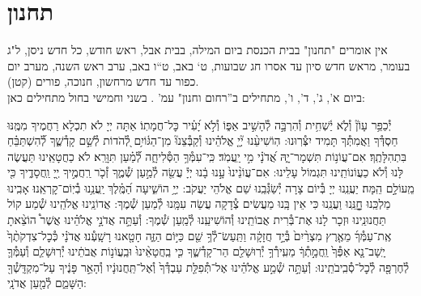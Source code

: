 \documentclass[twoside, openany, parskip=half, 11pt]{book}
\begin{document}
\nextpage


\section[תחנון]{ תחנון }
\label{tachanun mon thurs}
\begin{scriptsize}

\textsf{
אין אומרים "תחנון" בבית הכנסת ביום המילה, בבית אבל, ראש חודש, כל חדש ניסן, ל"ג בעומר, מראש חדש סיון עד אסרו חג שבועות, ט` באב, ט``ו באב, ערב ראש השנה, מערב יום כפור עד חדש מרחשון, חנוכה, פורים (קטן).\\
ביום א', ג', ד', ו', מתחילים ב''רחום וחנון" עמ'
\pageref{nefilas_apayim}.
בשני וחמישי בחול מתחילים כאן:
}

\end{scriptsize}

יְ֯כַפֵּ֥ר עָוֹן֘ וְ֯לֹ֢א יַ֫שְׁחִ֥ית וְ֯הִרְבָּ֣ה לְ֯הָשִׁ֣יב אַפּ֑וֹ וְ֯לֹ֣א יָ֝עִ֗יר כׇּל־חֲמָתֽוֹ׃ אַתָּה יְיָ לֹא תִכְלָא רַחֲמֶיךָ מִמֶּֽנּוּ חַסְדְּ֯ךָ וַאֲמִתְּ֯ךָ תָּמִיד יִצְּ֯רֽוּנוּ: הֽוֹשִׁיעֵ֨נוּ יְ֘יָ֤ אֱלֹהֵ֗ינוּ וְ֯קַבְּ֯צֵנוּ֘ מִן־הַגּ֫וֹיִ֥ם לְ֭֯הֹדוֹת לְ֯שֵׁ֣ם קָדְ֯שֶׁ֑ךָ לְ֝֯הִשְׁתַּבֵּ֗חַ בִּתְהִלָּתֶֽךָ׃
אִם־עֲוֹנ֥וֹת תִּשְׁמָר־יָ֑הּ אֲ֝דֹנָ֗י מִ֣י יַֽעֲמֹֽד׃ כִּֽי־עִמְּ֯ךָ֥ הַסְּ֯לִיחָ֑ה לְ֝֯מַ֗עַן תִּוָּרֵֽא׃ לֹא כַחֲטָאֵֽינוּ תַּעֲשֶׂה לָּנוּ וְ֯לֹא כַעֲוֹנוֹתֵֽינוּ תִּגְמוֹל עָלֵינוּ:
אִם־עֲוֹנֵ֨ינוּ֙ עָ֣נוּ בָ֔נוּ יְיָ֕ עֲשֵׂ֖ה לְ֯מַ֣עַן שְׁ֯מֶ֑ךָ זְ֯כֹ֤ר רַֽחֲמֶ֣יךָ יְ֖יָ וַֽחֲסָדֶ֑יךָ כִּ֖י מֵֽעוֹלָ֣ם הֵֽמָּה׃ יַעֲנֵֽנוּ יְיָ בְּ֯יוֹם צָרָה יְ֯שַׂגְּ֯בֵֽנוּ שֵׁם אֱלֹהֵי יַעֲקֹב:
יְיָ֥ הוֹשִׁ֑יעָה הַ֝מֶּֽ֗לֶךְ יַֽעֲנֵ֥נוּ בְ֯יֽוֹם־קׇרְאֵֽנוּ׃
אָבִֽינוּ מַלְכֵּֽנוּ חׇׇׇׇׇׇׇׇנֵּֽנוּ וַעֲנֵֽנוּ כִּי אֵין בָּֽנוּ מַעֲשִׂים צְ֯דָקָה עֲשֵׂה עִמָּֽנוּ לְ֯מַעַן שְׁ֯מֶךָ:
אֲדוֹנֵֽינוּ אֱלֹהֵֽינוּ שְׁ֯מַע קוֹל תַּחֲנוּנֵֽינוּ וּזְכָר לָנוּ אֶת־בְּ֯רִית אֲבוֹתֵֽינוּ וְ֯הוֹשִׁיעֵֽנוּ לְ֯מַֽעַן שְׁ֯מֶךָ:
וְ֯עַתָּ֣ה אֲדֹנָ֣י אֱלֹהֵ֗ינוּ אֲשֶׁר֩ הוֹצֵ֨אתָ אֶֽת־עַמְּ֯ךָ֜ מֵאֶ֤רֶץ מִצְרַ֨יִם֙ בְּ֯יָ֣ד חֲזָקָ֔ה וַתַּֽעַשׂ־לְ֯ךָ֥ שֵׁ֖ם כַּיּ֣וֹם הַזֶּ֑ה חָטָ֖אנוּ רָשָֽׁעְ֯נוּ׃
אֲדֹנָ֗י כְּ֯כׇל־צִדְקֹתֶ֨ךָ֙ יָֽשָׁב־נָ֤א אַפְּ֯ךָ֙ וַֽחֲמָ֣תְ֯ךָ֔ מֵעִֽירְ֯ךָ֥ יְ֯רֽוּשָׁלַ֖ם הַר־קָדְ֯שֶׁ֑ךָ כִּ֤י בַֽחֲטָאֵ֨ינוּ֙ וּבַֽעֲוֹנ֣וֹת אֲבֹתֵ֔ינוּ יְ֯רֽוּשָׁלַ֧ם וְ֯עַמְּ֯ךָ֛ לְ֯חֶרְפָּ֖ה לְ֯כׇל־סְ֯בִֽיבֹתֵֽינוּ:
וְ֯עַתָּ֣ה שְׁ֯מַ֣ע אֱלֹהֵ֗ינוּ אֶל־תְּ֯פִלַּ֤ת עַבְדְּ֯ךָ֙ וְ֯אֶל־תַּֽחֲנוּנָ֔יו וְ֯הָאֵ֣ר פָּנֶ֔יךָ עַל־מִקְדָּֽשְׁ֯ךָ֖ הַשָּׁמֵ֑ם לְ֯מַ֖עַן אֲדֹנָֽי:
\end{document}
